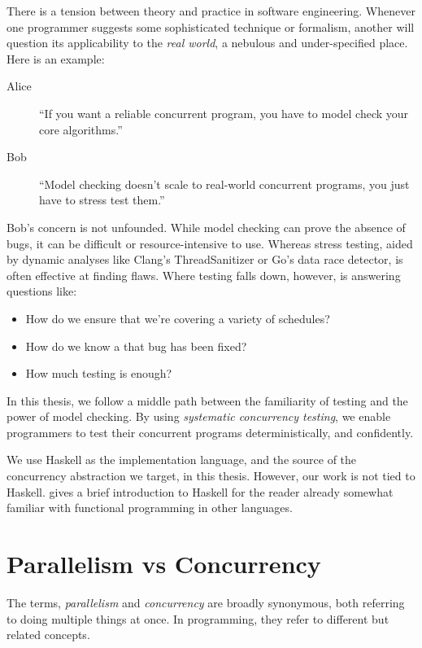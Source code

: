There is a tension between theory and practice in software
engineering.  Whenever one programmer suggests some sophisticated
technique or formalism, another will question its applicability to the
\emph{real world}, a nebulous and under-specified place.  Here is an
example:

\begin{description}
\item[Alice] ``If you want a reliable concurrent program, you have to
  model check your core algorithms.''
\item[Bob] ``Model checking doesn't scale to real-world concurrent
  programs, you just have to stress test them.''
\end{description}

Bob's concern is not unfounded.  While model checking can prove the
absence of bugs, it can be difficult or resource-intensive to use.
Whereas stress testing, aided by dynamic analyses like Clang's
ThreadSanitizer\cite{serebryany2009} or Go's data race
detector\cite{golang2017}, is often effective at finding flaws.  Where
testing falls down, however, is answering questions like:

\begin{itemize}
\item How do we ensure that we're covering a variety of schedules?
\item How do we know a that bug has been fixed?
\item How much testing is enough?
\end{itemize}

In this thesis, we follow a middle path between the familiarity of
testing and the power of model checking.  By using \emph{systematic
  concurrency testing}, we enable programmers to test their concurrent
programs deterministically, and confidently.

We use Haskell as the implementation language, and the source of the
concurrency abstraction we target, in this thesis.  However, our work
is not tied to Haskell.   gives a brief introduction
to Haskell for the reader already somewhat familiar with functional
programming in other languages.

\section{Parallelism vs Concurrency}
\label{sec:intro-parconc}

The terms, \emph{parallelism} and \emph{concurrency} are broadly
synonymous, both referring to doing multiple things at once.  In
programming, they refer to different but related concepts.

